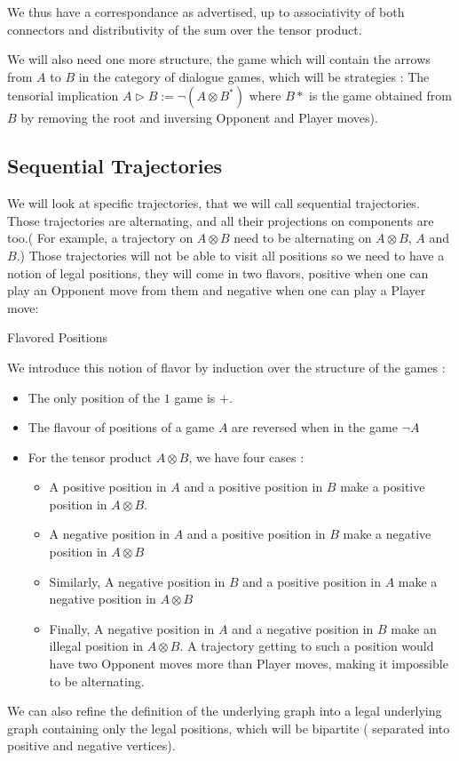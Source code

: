 \documentclass[a4paper,UKenglish]{lipics}
\begin{document}
We thus have a correspondance as advertised, up to associativity of both connectors and distributivity of the sum over the tensor product.

We will also need one more structure, the game which will contain the arrows from $A$ to $B$ in the category of dialogue games, which will be strategies : The tensorial implication $A \triangleright B := \neg (A \otimes  B^*)$ where $B*$ is the game obtained from $B$ by removing the root and inversing Opponent and Player moves).

\subsection{Sequential Trajectories}

We will look at specific trajectories, that we will call sequential trajectories. Those trajectories are alternating, and all their projections on components are too.( For example, a trajectory on $A \otimes B$ need to be alternating on $A \otimes B$, $A$ and $B$.) Those trajectories will not be able to visit all positions so we need to have a notion of legal positions, they will come in two flavors, positive when one can play an Opponent  move from them and negative when one can play a Player move:
\begin{definition}{Flavored Positions}

 We introduce this notion of flavor by induction over the structure of the games : 
\begin{itemize}
\item The only position of the $1$ game is $+$. 
\item The flavour of positions of a game $A$ are reversed when in the  game $\neg A$
\item  For the tensor product $ A\otimes B$, we have four cases :\\
\begin{itemize}
\item A positive position in $A$ and a positive position in $B$ make a positive position in $A \otimes B$.
\item A negative position in $A$ and a positive position in $B$ make a negative position in $A \otimes B$
\item Similarly, A negative position in $B$ and a positive position in $A$ make a negative position in $A \otimes B$
\item Finally, A negative position in $A$ and a negative position in $B$ make an illegal position in $A \otimes B$. A trajectory getting to such a position would have two Opponent moves more than Player moves, making it impossible to be alternating.\\
\end{itemize}
\end{itemize}
\end{definition}
We can also refine the definition of the underlying graph into a legal underlying graph containing only the legal positions, which will be bipartite ( separated into positive and negative vertices).
\end{document}
